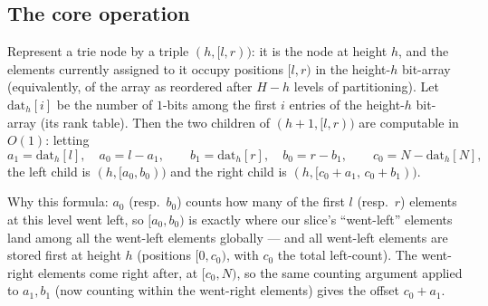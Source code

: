 \documentclass[11pt]{article}
\begin{document}
\subsection{The core operation}
Represent a trie node by a triple $(h, [l, r))$: it is the node at height
$h$, and the elements currently assigned to it occupy positions $[l, r)$ in
the height-$h$ bit-array (equivalently, of the array as reordered after
$H - h$ levels of partitioning). Let $\mathrm{dat}_h[i]$ be the number of
$1$-bits among the first $i$ entries of the height-$h$ bit-array (its rank
table). Then the two children of $(h+1, [l, r))$ are computable in $O(1)$:
letting
\[
  a_1 = \mathrm{dat}_h[l],\quad a_0 = l - a_1, \qquad
  b_1 = \mathrm{dat}_h[r],\quad b_0 = r - b_1, \qquad
  c_0 = N - \mathrm{dat}_h[N],
\]
the left child is $(h, [a_0, b_0))$ and the right child is
$(h, [c_0 + a_1,\, c_0 + b_1))$.

\begin{notebox}
Why this formula: $a_0$ (resp.\ $b_0$) counts how many of the first $l$
(resp.\ $r$) elements at this level went left, so $[a_0, b_0)$ is exactly
where our slice's ``went-left'' elements land among all the went-left
elements globally --- and all went-left elements are stored first at height
$h$ (positions $[0, c_0)$, with $c_0$ the total left-count). The
went-right elements come right after, at $[c_0, N)$, so the same
counting argument applied to $a_1, b_1$ (now counting within the
went-right elements) gives the offset $c_0 + a_1$.
\end{notebox}
\end{document}
